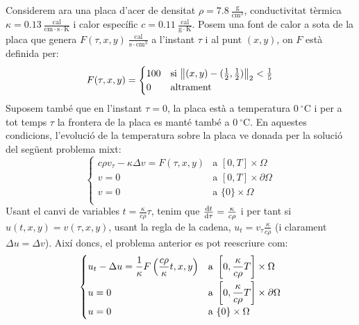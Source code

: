 \documentclass[10pt,a4paper]{article}
\theoremstyle{definition}
\theoremstyle{remark}
\begin{document}
Considerem ara una placa d'acer de densitat $\rho= 7.8\ \frac{\mathrm{g}}{\mathrm{cm}^3}$, conductivitat tèrmica $\kappa = 0.13\ \frac{\mathrm{cal}}{\mathrm{cm}\cdot\mathrm{s}\cdot\mathrm{K}}$ i calor específic $c=0.11\ \frac{\mathrm{cal}}{\mathrm{g}\cdot\mathrm{K}}$. Posem una font de calor a sota de la placa que genera $F(\tau, x,y) \ \frac{\mathrm{cal}}{\mathrm{s}\cdot\mathrm{cm}^3}$ a l'instant $\tau$ i al punt $(x,y)$, on $F$ està definida per:
$$
  F(\tau, x,y) = \begin{cases}
    100 & \text{si } \norm{(x,y)-(\frac{1}{2},\frac{1}{2})}_2 <\frac{1}{5} \\
    0   & \text{altrament}
  \end{cases}
$$
Suposem també que en l'instant $\tau=0$, la placa està a temperatura $0\ ^\circ\mathrm{C}$ i per a tot temps $\tau$ la frontera de la placa es manté també a $0\ ^\circ\mathrm{C}$. En aquestes condicions, l'evolució de la temperatura sobre la placa ve donada per la solució del següent problema mixt:
$$
  \begin{cases}
    c\rho v_{\tau} -\kappa \Delta v = F(\tau,x,y) & \text{a } [0,T] \times \Omega         \\
    v=0                                           & \text{a } [0,T] \times \partial\Omega \\
    v=0                                           & \text{a } \{0\} \times \Omega         \\
  \end{cases}
$$
Usant el canvi de variables $t=\frac{\kappa}{c\rho}\tau$, tenim que $\dv{t}{\tau}= \frac{\kappa}{c\rho}$ i per tant si $u(t,x,y)=v(\tau,x,y)$, usant la regla de la cadena, $u_t = v_\tau \frac{\kappa}{c\rho}$ (i clarament $\Delta u=\Delta v$). Així doncs, el problema anterior es pot reescriure com:
$$
  \begin{cases}
    \displaystyle u_t -\Delta u = \frac{1}{\kappa} F\left(\frac{c\rho}{\kappa}t,x,y\right) & \displaystyle\text{a } \left[0,\frac{\kappa}{c\rho}T\right] \times \Omega  \vspace{0.1cm} \\
    u=0                                                                                    & \displaystyle\text{a } \left[0,\frac{\kappa}{c\rho}T\right] \times \partial\Omega         \\
    u=0                                                                                    & \text{a } \{0\} \times \Omega                                                             \\
  \end{cases}
$$
\end{document}
